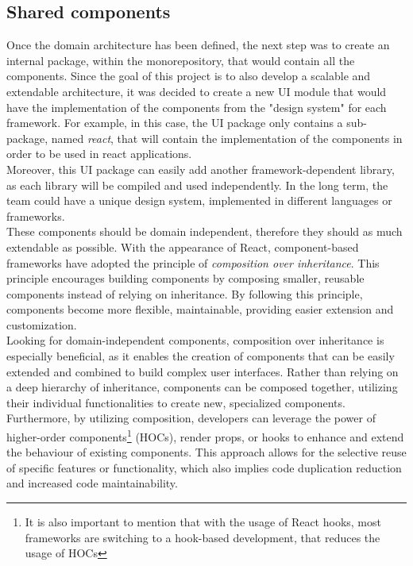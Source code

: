\documentclass[../design.tex]{subfiles}
\begin{document}
\subsection{Shared components}
Once the domain architecture has been defined, the next step was to create an
internal package, within the monorepository, that would contain all the
components. Since the goal of this project is to also develop a scalable and
extendable architecture, it was decided to create a new UI module that would
have the implementation of the components from the "design system" for each
framework. For example, in this case, the UI package only contains a
sub-package, named \emph{react}, that will contain the implementation of the
components in order to be used in react applications.
\\
Moreover, this UI package can easily add another framework-dependent library, as
each library will be compiled and used independently. In the long term, the team
could have a unique design system, implemented in different languages or
frameworks.
\\[8pt]
These components should be domain independent, therefore they should as much
extendable as possible. With the appearance of React, component-based frameworks
have adopted the principle of \emph{composition over inheritance}. This
principle encourages building components by composing smaller, reusable
components instead of relying on inheritance. By following this principle,
components become more flexible, maintainable, providing easier extension and
customization.
\\
Looking for domain-independent components, composition over inheritance is
especially beneficial, as it enables the creation of components that can be
easily extended and combined to build complex user interfaces. Rather than
relying on a deep hierarchy of inheritance, components can be composed together,
utilizing their individual functionalities to create new, specialized
components.
\\
Furthermore, by utilizing composition, developers can leverage the power of
higher-order components\footnote{It is also important to mention that with the
	usage of React hooks, most frameworks are switching to a hook-based development,
	that reduces the usage of HOCs} (HOCs), render props, or hooks to enhance and
extend the behaviour of existing components. This approach allows for the
selective reuse of specific features or functionality, which also implies code
duplication reduction and increased code maintainability.
\\
\end{document}
